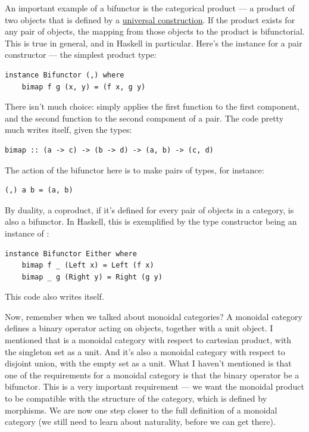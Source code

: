 An important example of a bifunctor is the categorical product --- a
product of two objects that is defined by a \hyperref[products-and-coproducts]{universal
construction}. If the product exists for any pair of objects, the
mapping from those objects to the product is bifunctorial. This is true
in general, and in Haskell in particular. Here's the 
instance for a pair constructor --- the simplest product type:

\begin{verbatim}
instance Bifunctor (,) where 
    bimap f g (x, y) = (f x, g y)
\end{verbatim}
There isn't much choice:  simply applies the first
function to the first component, and the second function to the second
component of a pair. The code pretty much writes itself, given the
types:

\begin{verbatim}
bimap :: (a -> c) -> (b -> d) -> (a, b) -> (c, d)
\end{verbatim}
The action of the bifunctor here is to make pairs of types, for
instance:

\begin{verbatim}
(,) a b = (a, b)
\end{verbatim}
By duality, a coproduct, if it's defined for every pair of objects in a
category, is also a bifunctor. In Haskell, this is exemplified by the
 type constructor being an instance of
:

\begin{verbatim}
instance Bifunctor Either where
    bimap f _ (Left x) = Left (f x)
    bimap _ g (Right y) = Right (g y)
\end{verbatim}
This code also writes itself.

Now, remember when we talked about monoidal categories? A monoidal
category defines a binary operator acting on objects, together with a
unit object. I mentioned that  is a monoidal category with
respect to cartesian product, with the singleton set as a unit. And it's
also a monoidal category with respect to disjoint union, with the empty
set as a unit. What I haven't mentioned is that one of the requirements
for a monoidal category is that the binary operator be a bifunctor. This
is a very important requirement --- we want the monoidal product to be
compatible with the structure of the category, which is defined by
morphisms. We are now one step closer to the full definition of a
monoidal category (we still need to learn about naturality, before we
can get there).

